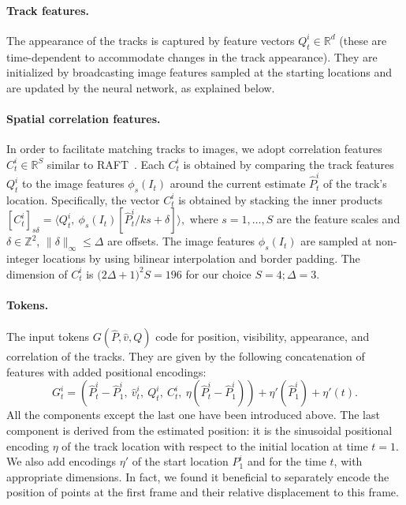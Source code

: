 \paragraph{Track features.}

The appearance of the tracks is captured by feature vectors $Q_t^i \in \mathbb{R}^{d}$ (these are time-dependent to accommodate changes in the track appearance).
They are initialized by broadcasting image features sampled at the starting locations and are updated by the neural network, as explained below.

\paragraph{Spatial correlation features.}

In order to facilitate matching tracks to images, we adopt correlation features $C^i_t \in \mathbb{R}^S$ similar to RAFT~\cite{raft}.
Each $C^i_t$ is obtained by comparing the track features $Q_t^i$ to the image features $\phi_s(I_t)$ around the current estimate $\hat P_t^i$ of the track's location.
Specifically, the vector $C_{t}^i$ is obtained by stacking the inner products
$
[C_t^i]_{s\delta}
=
\langle
Q^i_t,~
\phi_s(I_t)[
  \hat P_t^i / ks + \delta
]
\rangle,
$
where
$
s = 1,\dots, S
$
are the feature scales
and
$
\delta \in \mathbb{Z}^2
$,
$
\| \delta \|_\infty \leq \Delta
$
are offsets.
The image features $\phi_s(I_t)$ are sampled at non-integer locations by using bilinear interpolation and border padding.
The dimension of $C^{i}_t$ is $\big (2\Delta+1)^2 S=196$ for our choice $S = 4; \Delta = 3$.

\paragraph{Tokens.}

The input tokens $G(\hat P, \hat v, Q)$ code for position, visibility, appearance, and correlation of the tracks.
They are given by the following concatenation of features with added positional encodings:
\begin{equation}
   G^i_t = (
   \hat P^i_t - \hat P^i_1,~
   \hat v^i_t,~
   Q^i_t,~
   C^i_t,~
   \eta (\hat P^i_t - \hat P^i_1)
   )
   + \eta'(\hat P^i_1) + \eta'(t).
\end{equation}
All the components except the last one have been introduced above.
The last component is derived from the estimated position: it is the sinusoidal positional encoding $\eta$ of the track location with respect to the initial location at time $t=1$.
We also add encodings $\eta'$ of the start location $P^i_1$ and for the time $t$, with appropriate dimensions.
In fact, we found it beneficial to separately encode the position of points at the first frame and their relative displacement to this frame.

